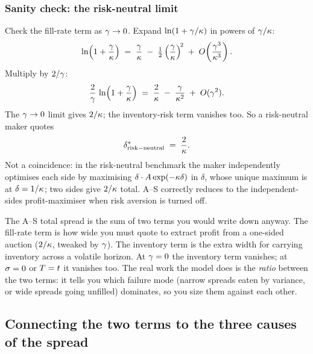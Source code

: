 \subsubsection{Sanity check: the risk-neutral limit}

Check the fill-rate term as $\gamma \to 0$. Expand
$\ln(1 + \gamma/\kappa)$ in powers of $\gamma/\kappa$:
\begin{equation}
  \ln\!\left(1 + \frac{\gamma}{\kappa}\right)
  \;=\; \frac{\gamma}{\kappa}
        \;-\; \tfrac{1}{2}\left(\frac{\gamma}{\kappa}\right)^{\!2}
        \;+\; O\!\left(\frac{\gamma^3}{\kappa^3}\right).
\end{equation}
Multiply by $2/\gamma$:
\begin{equation}
  \frac{2}{\gamma}\,\ln\!\left(1 + \frac{\gamma}{\kappa}\right)
  \;=\; \frac{2}{\kappa}
        \;-\; \frac{\gamma}{\kappa^2}
        \;+\; O(\gamma^2).
\end{equation}
The $\gamma \to 0$ limit gives $2/\kappa$; the inventory-risk
term vanishes too. So a risk-neutral maker quotes
\begin{equation}
  \delta^*_{\mathrm{risk-neutral}} \;=\; \frac{2}{\kappa}.
\end{equation}
Not a coincidence: in the risk-neutral benchmark the maker
independently optimises each side by maximising
$\delta \cdot A\exp(-\kappa\delta)$ in $\delta$, whose unique
maximum is at $\delta = 1/\kappa$; two sides give $2/\kappa$
total. A--S correctly reduces to the independent-sides
profit-maximiser when risk aversion is turned off.

\begin{intuitionbox}
The A--S total spread is the sum of two terms you would write down
anyway. The fill-rate term is how wide you must quote to extract
profit from a one-sided auction ($2/\kappa$, tweaked by $\gamma$).
The inventory term is the extra width for carrying inventory across
a volatile horizon. At $\gamma = 0$ the inventory term vanishes; at
$\sigma = 0$ or $T = t$ it vanishes too. The real work the model
does is the \emph{ratio} between the two terms: it tells you which
failure mode (narrow spreads eaten by variance, or wide spreads
going unfilled) dominates, so you size them against each other.
\end{intuitionbox}

\subsection{Connecting the two terms to the three causes of the spread}
\label{subsec:ch8_three_causes}

